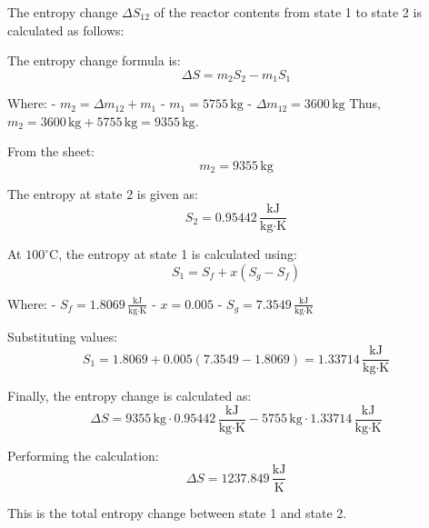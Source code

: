 The entropy change \( \Delta S_{12} \) of the reactor contents from state 1 to state 2 is calculated as follows:

The entropy change formula is:  
\[
\Delta S = m_2 S_2 - m_1 S_1
\]

Where:  
- \( m_2 = \Delta m_{12} + m_1 \)  
- \( m_1 = 5755 \, \text{kg} \)  
- \( \Delta m_{12} = 3600 \, \text{kg} \)  
Thus, \( m_2 = 3600 \, \text{kg} + 5755 \, \text{kg} = 9355 \, \text{kg} \).

From the sheet:  
\[
m_2 = 9355 \, \text{kg}
\]

The entropy at state 2 is given as:  
\[
S_2 = 0.95442 \, \frac{\text{kJ}}{\text{kg·K}}
\]

At \( 100^\circ\text{C} \), the entropy at state 1 is calculated using:  
\[
S_1 = S_f + x (S_g - S_f)
\]

Where:  
- \( S_f = 1.8069 \, \frac{\text{kJ}}{\text{kg·K}} \)  
- \( x = 0.005 \)  
- \( S_g = 7.3549 \, \frac{\text{kJ}}{\text{kg·K}} \)  

Substituting values:  
\[
S_1 = 1.8069 + 0.005 (7.3549 - 1.8069) = 1.33714 \, \frac{\text{kJ}}{\text{kg·K}}
\]

Finally, the entropy change is calculated as:  
\[
\Delta S = 9355 \, \text{kg} \cdot 0.95442 \, \frac{\text{kJ}}{\text{kg·K}} - 5755 \, \text{kg} \cdot 1.33714 \, \frac{\text{kJ}}{\text{kg·K}}
\]

Performing the calculation:  
\[
\Delta S = 1237.849 \, \frac{\text{kJ}}{\text{K}}
\]  

This is the total entropy change between state 1 and state 2.
